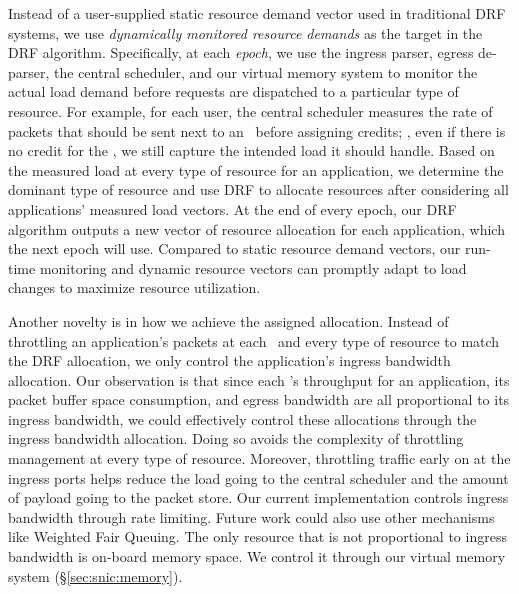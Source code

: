 Instead of a user-supplied static resource demand vector used in traditional DRF systems, we use {\em dynamically monitored resource demands} as the target in the DRF algorithm.
Specifically, at each {\em epoch}, we use the ingress parser, egress de-parser, the central scheduler, and our virtual memory system to monitor the actual load demand before requests are dispatched to a particular type of resource.
For example, for each user, the central scheduler measures the rate of packets that should be sent next to an \nt\ before assigning credits; \ie, even if there is no credit for the \nt, we still capture the intended load it should handle.
Based on the measured load at every type of resource for an application, we determine the dominant type of resource and use DRF to allocate resources after considering all applications' measured load vectors.
At the end of every epoch, our DRF algorithm outputs a new vector of resource allocation for each application, which the next epoch will use.
Compared to static resource demand vectors, our run-time monitoring and dynamic resource vectors can promptly adapt to load changes to maximize resource utilization. %


Another novelty is in how we achieve the assigned allocation.
Instead of throttling an application's packets at each \nt\ and every type of resource to match the DRF allocation, we only control the application's ingress bandwidth allocation.
Our observation is that since each \nt's throughput for an application, its packet buffer space consumption, and egress bandwidth are all proportional to its ingress bandwidth, we could effectively control these allocations through the ingress bandwidth allocation.
Doing so avoids the complexity of throttling management at every type of resource.
Moreover, throttling traffic early on at the ingress ports helps reduce the load going to the central scheduler and the amount of payload going to the packet store.
Our current implementation controls ingress bandwidth through rate limiting.
Future work could also use other mechanisms like Weighted Fair Queuing.
The only resource that is not proportional to ingress bandwidth is on-board memory space.
We control it through our virtual memory system (\S\ref{sec:snic:memory}).

